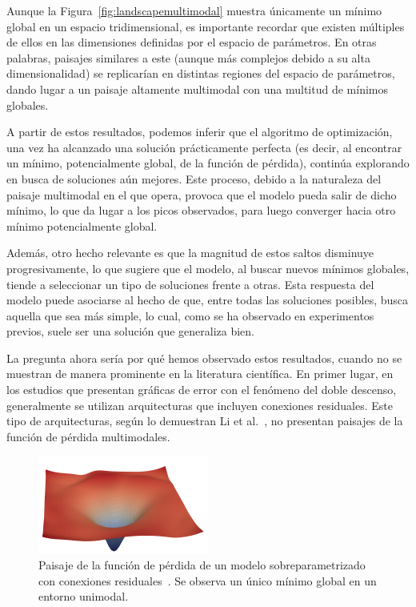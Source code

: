 Aunque la Figura~\ref{fig:landscapemultimodal} muestra únicamente un mínimo global en un espacio tridimensional, es importante recordar que existen múltiples de ellos en las dimensiones definidas por el espacio de parámetros. En otras palabras, paisajes similares a este (aunque más complejos debido a su alta dimensionalidad) se replicarían en distintas regiones del espacio de parámetros, dando lugar a un paisaje altamente multimodal con una multitud de mínimos globales.\newline  

A partir de estos resultados, podemos inferir que el algoritmo de optimización, una vez ha alcanzado una solución prácticamente perfecta (es decir, al encontrar un mínimo, potencialmente global, de la función de pérdida), continúa explorando en busca de soluciones aún mejores. Este proceso, debido a la naturaleza del paisaje multimodal en el que opera, provoca que el modelo pueda salir de dicho mínimo, lo que da lugar a los picos observados, para luego converger hacia otro mínimo potencialmente global.\newline

Además, otro hecho relevante es que la magnitud de estos saltos disminuye progresivamente, lo que sugiere que el modelo, al buscar nuevos mínimos globales, tiende a seleccionar un tipo de soluciones frente a otras. Esta respuesta del modelo puede asociarse al hecho de que, entre todas las soluciones posibles, busca aquella que sea más simple, lo cual, como se ha observado en experimentos previos, suele ser una solución que generaliza bien.\newline

La pregunta ahora sería por qué hemos observado estos resultados, cuando no se muestran de manera prominente en la literatura científica. En primer lugar, en los estudios que presentan gráficas de error con el fenómeno del doble descenso, generalmente se utilizan arquitecturas que incluyen conexiones residuales. Este tipo de arquitecturas, según lo demuestran Li et al.~\cite{Li2018}, no presentan paisajes de la función de pérdida multimodales.\newline

\begin{figure}[h]
    \centering
    \includegraphics[width=0.5\textwidth]{img/experiments/landscapeunimodal.png}
    \caption[Paisaje de la función de pérdida de un modelo sobreparametrizado con conexiones residuales~\cite{Li2018}.]{Paisaje de la función de pérdida de un modelo sobreparametrizado con conexiones residuales~\cite{Li2018}. Se observa un único mínimo global en un entorno unimodal.}\label{fig:landscapeunimodal}
\end{figure}

